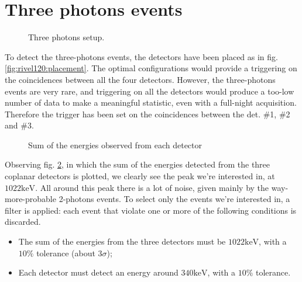\documentclass[11pt,a4 paper]{article}
\begin{document}
\section{Three photons events}

\begin{figure}[H]
    \centering
    { \label{fig:rivel120:placement}} \quad
    {}
    \caption{Three photons setup.}
    \label{fig:rivel120}
\end{figure}
To detect the three-photons events, the detectors have been placed as in fig. \ref{fig:rivel120:placement}. The optimal configurations would provide a triggering on the coincidences between all the four detectors. However, the three-photons events are very rare, and triggering on all the detectors would produce a too-low number of data to make a meaningful statistic, even with a full-night acquisition. Therefore the trigger has been set on the coincidences between the det. \#1, \#2 and \#3.
\begin{figure}[H]
    \centering
    \caption{Sum of the energies observed from each detector}
    \label{fig:sum:3gamma}
\end{figure}
Observing fig. \ref{fig:sum:3gamma}, in which the sum of the energies detected from the three coplanar detectors is plotted, we clearly see the peak we're interested in, at $1022\si{\kilo\electronvolt}$. All around this peak there is a lot of noise, given mainly by the way-more-probable 2-photons events. To select only the events we're interested in, a filter is applied: each event that violate one or more of the following conditions is discarded.
\begin{itemize}[noitemsep]
    \item The sum of the energies from the three detectors must be $1022\si{\kilo\electronvolt}$, with a $10\%$ tolerance (about $3\sigma$);
    \item Each detector must detect an energy around $340\si{\kilo\electronvolt}$, with a $10\%$ tolerance.
\end{itemize}
\end{document}
